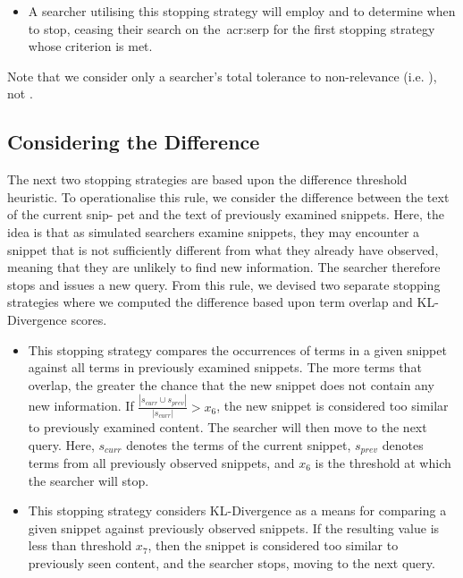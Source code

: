 \begin{itemize}
    \item[\blueboxbold{SS5}] A searcher utilising this stopping strategy will employ  and  to determine when to stop, ceasing their search on the~\gls{acr:serp} for the first stopping strategy whose criterion is met.
\end{itemize}

Note that we consider only a searcher's total tolerance to non-relevance (i.e. ), not .


\subsection{Considering the Difference}
The next two stopping strategies are based upon the difference threshold heuristic. To operationalise this rule, we consider the difference between the text of the current snip- pet and the text of previously examined snippets. Here, the idea is that as simulated searchers examine snippets, they may encounter a snippet that is not sufficiently different from what they already have observed, meaning that they are unlikely to find new information. The searcher therefore stops and issues a new query. From this rule, we devised two separate stopping strategies where we computed the difference based upon term overlap and KL-Divergence scores.

\begin{itemize}
    \item[\blueboxbold{SS6}] This stopping strategy compares the occurrences of terms in a given snippet against all terms in previously examined snippets. The more terms that overlap, the greater the chance that the new snippet does not contain any new information. If $\frac{|s_{curr} \cup s_{prev}|}{|s_{curr}|} > x_6$, the new snippet is considered too similar to previously examined content. The searcher will then move to the next query. Here, $s_{curr}$ denotes the terms of the current snippet, $s_{prev}$ denotes terms from all previously observed snippets, and $x_6$ is the threshold at which the searcher will stop.
\end{itemize}

\begin{itemize}
    \item[\blueboxbold{SS7}] This stopping strategy considers KL-Divergence as a means for comparing a given snippet against previously observed snippets. If the resulting value is less than threshold $x_7$, then the snippet is considered too similar to previously seen content, and the searcher stops, moving to the next query.
\end{itemize}

